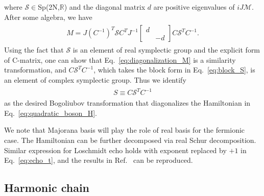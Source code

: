 where $\mathcal{S}\in$Sp(2N,$\mathbb{R}$) and the diagonal matrix $d$ are positive eigenvalues of $iJ\mathcal{M}$. After some algebra, we have
\begin{eqnarray}\begin{aligned}
\label{eq:diagonalization_M}
M=J(C^{-1})^T\mathcal{S}C^TJ^{-1}
\begin{bmatrix}
d\\
&-d
\end{bmatrix}
C\mathcal{S}^TC^{-1}.
\end{aligned}\end{eqnarray}
Using the fact that $\mathcal{S}$ is an element of real symplectic group and the explicit form of C-matrix, one can show that Eq.~\eqref{eq:diagonalization_M} is a similarity transformation, and $C\mathcal{S}^TC^{-1}$, which takes the block form in Eq.~\eqref{eq:block_S}, is an element of complex symplectic group. Thus we identify 
\begin{eqnarray*}\begin{aligned}
S\equiv C\mathcal{S}^TC^{-1}
\end{aligned}\end{eqnarray*}
as the desired Bogoliubov transformation that diagonalizes the Hamiltonian in Eq.~\eqref{eq:quadratic_boson_H}. 

We note that Majorana basis will play the role of real basis for the fermionic case. The Hamiltonian can be further decomposed via real Schur decomposition. Similar expression for Loschmidt echo holds with exponent replaced by $+1$ in Eq.~\eqref{eq:echo_t}, and the results in Ref.~ can be reproduced.  

\subsection{Harmonic chain}
\label{app_sub:harmonic_chain}

